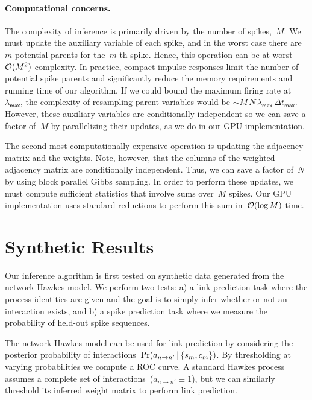 \paragraph{Computational concerns.}
The complexity of
inference is primarily driven by the number of spikes,~$M$. We must
update the auxiliary variable of each spike, and in the worst case
there are~$m$ potential parents for the~$m$-th spike. Hence, this
operation can be at worst~$\mathcal{O}(M^2)$ complexity.  In practice,
compact impulse responses limit the number of potential spike parents
and significantly reduce the memory requirements and running time of
our algorithm. If we could bound the maximum firing rate at~$\lambda_{\mathsf{max}}$,
the complexity of resampling parent variables would be ${\sim M \, N \, \lambda_{\mathsf{max}} \, \Delta t_{\mathsf{max}}}$. However, these auxiliary
variables are conditionally independent so we can save a factor of~$M$
by parallelizing their updates, as we do in our GPU implementation.

The second most computationally expensive operation is updating the
adjacency matrix and the weights. Note, however, that the columns of
the weighted adjacency matrix are conditionally independent. Thus,
we can save a factor of~$N$ by using block parallel Gibbs sampling.
In order to perform these updates, we must compute sufficient statistics
that involve sums over~$M$ spikes. Our GPU implementation uses
standard reductions to perform this sum in~$\mathcal{O}(\log M)$ time.


\section{Synthetic Results}
\label{sec:synth}
Our inference algorithm is first tested on synthetic data generated
from the network Hawkes model. We perform two tests: a) a link
prediction task where the process identities are given and the goal is
to simply infer whether or not an interaction exists, and b) a spike
prediction task where we measure the probability of held-out spike
sequences.

The network Hawkes model can be used for link prediction by
considering the posterior probability of interactions~$\Pr(a_{n \to
  n'}\,|\, \{s_m,c_m\})$. By thresholding at varying probabilities we
compute a ROC curve. A standard Hawkes process assumes a complete set
of interactions~($a_{n \to n'}\equiv 1$), but we can similarly threshold
its inferred weight matrix to perform link prediction.

